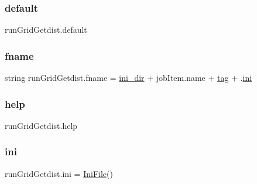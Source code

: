 \mbox{\label{namespacerunGridGetdist_a67d379c99e2d288689d45542651ec0fe}} 
\subsubsection{\texorpdfstring{default}{default}}
{\footnotesize\ttfamily run\+Grid\+Getdist.\+default}

\mbox{\label{namespacerunGridGetdist_aa70fea69807ee2a64c74791e8994967e}} 
\subsubsection{\texorpdfstring{fname}{fname}}
{\footnotesize\ttfamily string run\+Grid\+Getdist.\+fname = \mbox{\hyperlink{namespacerunGridGetdist_acae298d9a0099550bdf9d75b3ef72e47}{ini\+\_\+dir}} + job\+Item.\+name + \mbox{\hyperlink{namespacerunGridGetdist_a533e66844598c5a6bfdfe6e81d24859d}{tag}} + \textquotesingle{}.\mbox{\hyperlink{namespacerunGridGetdist_a5c45b173d8ff043e9a4f7dd67d9e5076}{ini}}\textquotesingle{}}

\mbox{\label{namespacerunGridGetdist_a8e0f7c917fa369f9b78a52a760d22fbf}} 
\subsubsection{\texorpdfstring{help}{help}}
{\footnotesize\ttfamily run\+Grid\+Getdist.\+help}

\mbox{\label{namespacerunGridGetdist_a5c45b173d8ff043e9a4f7dd67d9e5076}} 
\subsubsection{\texorpdfstring{ini}{ini}}
{\footnotesize\ttfamily run\+Grid\+Getdist.\+ini = \mbox{\hyperlink{classgetdist_1_1inifile_1_1IniFile}{Ini\+File}}()}

